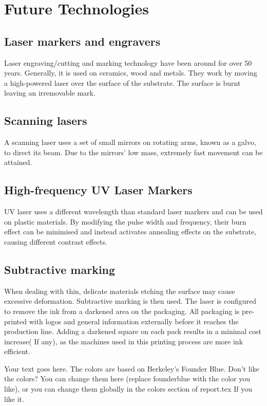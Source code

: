 \chapter{Future Technologies}
\pagestyle{fancy}

\section{Laser markers and engravers}
Laser engraving/cutting and marking technology have been around for over 50 years. Generally, it is used on ceramics, wood and metals. They work by moving a high-powered laser over the surface of the substrate. The surface is burnt leaving an irremovable mark.

\section{Scanning lasers}
A scanning laser uses a set of small mirrors on rotating arms, known as a galvo, to direct its beam. Due to the mirrors' low mass, extremely fast movement can be attained. 

\section{High-frequency UV Laser Markers}
UV laser uses a different wavelength than standard laser markers and can be used on plastic materials. By modifying the pulse width and frequency, their burn effect can be minimised and instead activates annealing effects on the substrate, causing different contrast effects.

\section{Subtractive marking}
When dealing with thin, delicate materials etching the surface may cause excessive deformation. Subtractive marking is then used. The laser is configured to remove the ink from a darkened area on the packaging. All packaging is pre-printed with logos and general information externally before it reaches the production line. 
Adding a darkened square on each pack results in a minimal cost increase( If any), as the machines used in this printing process are more ink efficient.


\begin{tcolorbox}[breakable,title={An example colorbox},
colback=founderblue!5!white,
colframe=founderblue!75!black,
fonttitle=\headingfont\bfseries\large]
Your text goes here. The colors are based on Berkeley's Founder Blue.
Don't like the colors? You can change them here (replace founderblue with the color you like), or you can change them globally in the colors section of report.tex
If you like it.
\end{tcolorbox}






